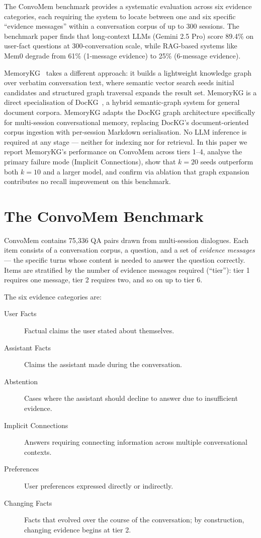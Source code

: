 \documentclass[11pt,a4paper]{article}
\begin{document}
The ConvoMem benchmark \citep{pakhomov2025convomem} provides a systematic evaluation
across six evidence categories, each requiring the system to locate between one and six
specific ``evidence messages'' within a conversation corpus of up to 300 sessions.
The benchmark paper finds that long-context LLMs (Gemini 2.5 Pro) score 89.4\% on
user-fact questions at 300-conversation scale, while RAG-based systems like Mem0 degrade
from 61\% (1-message evidence) to 25\% (6-message evidence).

MemoryKG~\citep{memorykg2026} takes a different approach: it builds a lightweight
knowledge graph over verbatim conversation text, where semantic vector search seeds
initial candidates and structured graph traversal expands the result set.
MemoryKG is a direct specialisation of DocKG~\citep{dockg2026}, a hybrid
semantic-graph system for general document corpora.
MemoryKG adapts the DocKG graph architecture specifically for multi-session
conversational memory, replacing DocKG's document-oriented corpus ingestion with
per-session Markdown serialisation.
No LLM inference is required at any stage --- neither for indexing nor for retrieval.
In this paper we report MemoryKG's performance on ConvoMem across tiers 1--4,
analyse the primary failure mode (Implicit Connections), show that $k{=}20$ seeds
outperform both $k{=}10$ and a larger model, and confirm via ablation that graph
expansion contributes no recall improvement on this benchmark.

\section{The ConvoMem Benchmark}
\label{sec:benchmark}

ConvoMem \citep{pakhomov2025convomem} contains 75,336 QA pairs drawn from multi-session
dialogues.
Each item consists of a conversation corpus, a question, and a set of \emph{evidence
messages} --- the specific turns whose content is needed to answer the question correctly.
Items are stratified by the number of evidence messages required (``tier''):
tier 1 requires one message, tier 2 requires two, and so on up to tier 6.

The six evidence categories are:

\begin{description}
  \item[User Facts] Factual claims the user stated about themselves.
  \item[Assistant Facts] Claims the assistant made during the conversation.
  \item[Abstention] Cases where the assistant should decline to answer due to
        insufficient evidence.
  \item[Implicit Connections] Answers requiring connecting information across
        multiple conversational contexts.
  \item[Preferences] User preferences expressed directly or indirectly.
  \item[Changing Facts] Facts that evolved over the course of the conversation;
        by construction, changing evidence begins at tier 2.
\end{description}
\end{document}
